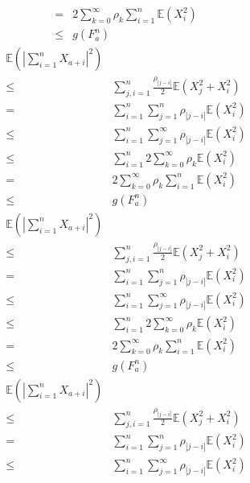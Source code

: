 \documentclass{ctexart}
\begin{document}
\begin{remark}
\begin{equation}
\begin{aligned}
      =& 2\sum_{k=0}^{\infty}\rho_k  \sum_{i=1}^{n}\mathbb{E}(X_i^2)\\
      \leq & g(F_a^n)
    \end{aligned}
  \end{equation}
  \begin{equation}
    \begin{aligned}
      \mathbb{E}(|\sum_{i=1}^{n}X_{a+i}|^2) \\
      \leq & \sum_{j,i = 1}^{n} \frac{\rho_{|j-i|}}{2}\mathbb{E}(X_j^2 + X_i^2)\\
      =& \sum_{i=1}^{n} \sum_{j=1}^{n}\rho_{|j-i|}\mathbb{E}(X_i^2)\\
      \leq & \sum_{i=1}^{n} \sum_{j=1}^{\infty} \rho_{|j-i|}\mathbb{E}(X_i^2)\\
      \leq & \sum_{i=1}^{n} 2\sum_{k=0}^{\infty} \rho_k \mathbb{E}(X_i^2)\\
      =& 2\sum_{k=0}^{\infty}\rho_k  \sum_{i=1}^{n}\mathbb{E}(X_i^2)\\
      \leq & g(F_a^n)
    \end{aligned}
  \end{equation}
  \begin{equation}
    \begin{aligned}
      \mathbb{E}(|\sum_{i=1}^{n}X_{a+i}|^2) \\
      \leq & \sum_{j,i = 1}^{n} \frac{\rho_{|j-i|}}{2}\mathbb{E}(X_j^2 + X_i^2)\\
      =& \sum_{i=1}^{n} \sum_{j=1}^{n}\rho_{|j-i|}\mathbb{E}(X_i^2)\\
      \leq & \sum_{i=1}^{n} \sum_{j=1}^{\infty} \rho_{|j-i|}\mathbb{E}(X_i^2)\\
      \leq & \sum_{i=1}^{n} 2\sum_{k=0}^{\infty} \rho_k \mathbb{E}(X_i^2)\\
      =& 2\sum_{k=0}^{\infty}\rho_k  \sum_{i=1}^{n}\mathbb{E}(X_i^2)\\
      \leq & g(F_a^n)
    \end{aligned}
  \end{equation}
  \begin{equation}
    \begin{aligned}
      \mathbb{E}(|\sum_{i=1}^{n}X_{a+i}|^2) \\
      \leq & \sum_{j,i = 1}^{n} \frac{\rho_{|j-i|}}{2}\mathbb{E}(X_j^2 + X_i^2)\\
      =& \sum_{i=1}^{n} \sum_{j=1}^{n}\rho_{|j-i|}\mathbb{E}(X_i^2)\\
      \leq & \sum_{i=1}^{n} \sum_{j=1}^{\infty} \rho_{|j-i|}\mathbb{E}(X_i^2)\\

\end{aligned}
\end{equation}
\end{remark}
\end{document}
